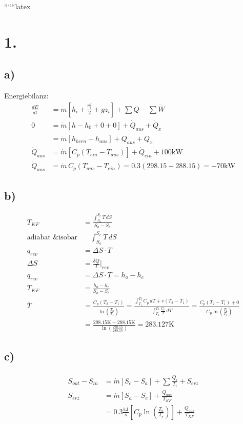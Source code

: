 
``````latex


\section*{1.}
\subsection*{a)}
Energiebilanz:
\begin{align*}
\frac{dE}{dt} &= \dot{m} \left[ h_i + \frac{v_i^2}{2} + g z_i \right] + \sum \dot{Q} - \sum \dot{W} \\
0 &= \dot{m} \left[ h - h_0 + 0 + 0 \right] + \dot{Q}_{aus} + \dot{Q}_x \\
&= \dot{m} \left[ h_{kern} - h_{aus} \right] + \dot{Q}_{aus} + \dot{Q}_x \\
\dot{Q}_{aus} &= \dot{m} \left[ C_p (T_{ein} - T_{aus}) \right] + \dot{Q}_{ein} + 100 \text{kW} \\
\dot{Q}_{aus} &= \dot{m} \, C_p (T_{aus} - T_{ein}) = 0.3 (298.15 - 288.15) = -70 \text{kW}
\end{align*}

\subsection*{b)}
\begin{align*}
T_{KF} &= \frac{\int_{S_a}^{S_e} T \, dS}{S_a - S_e} \\
\text{adiabat \& isobar} & \quad \int_{S_a}^{S_e} T \, dS \\
q_{rev} &= \Delta S \cdot T \\
\Delta S &= \frac{\delta Q}{T} \bigg|_{rev} \\
q_{rev} &= \Delta S \cdot T = h_a - h_e \\
T_{KF} &= \frac{h_a - h_e}{S_a - S_e} \\
\bar{T} &= \frac{C_p (T_2 - T_1)}{\ln \left( \frac{T_2}{T_1} \right)} = \frac{\int_{T_1}^{T_2} C_p \, dT + v(T_2 - T_1)}{\int_{T_1}^{T_2} \frac{C_p}{T} \, dT} = \frac{C_p (T_2 - T_1) + 0}{C_p \ln \left( \frac{T_2}{T_1} \right)} \\
&= \frac{298.15 \text{K} - 288.15 \text{K}}{\ln \left( \frac{298.15}{288.15} \right)} = 283.127 \text{K}
\end{align*}

\subsection*{c)}
\begin{align*}
S_{out} - S_{in} &= \dot{m} [S_e - S_a] + \sum \frac{\dot{Q}_i}{T_i} + S_{erz} \\
S_{erz} &= \dot{m} [S_a - S_e] + \frac{Q_{aus}}{T_{KF}} \\
&= 0.3 \frac{\text{kJ}}{\text{s}} \left[ C_p \ln \left( \frac{T_a}{T_e} \right) \right] + \frac{Q_{aus}}{T_{KF}}
\end{align*}

